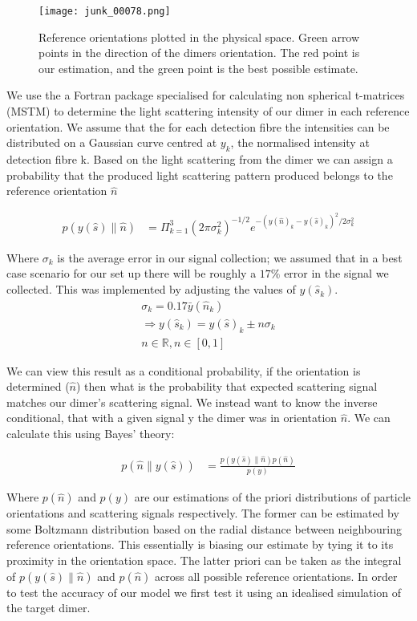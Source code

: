 \documentclass[11pt]{article}
\begin{document}
	\begin{figure}[t]
		\centering
		\texttt{[image: junk\_00078.png]}
		\caption{Reference orientations plotted in the physical space. Green arrow points in the direction of the dimers orientation. The red point is our estimation, and the green point is the best possible estimate.}
	\end{figure}
	
	We use the a Fortran package specialised for calculating non spherical t-matrices (MSTM) \cite{MSTM} to determine the light scattering intensity of our dimer in each reference orientation. We assume that the for each detection fibre the intensities can be distributed on a Gaussian curve centred at $y_k$, the normalised intensity at detection fibre k. Based on the light scattering from the dimer we can assign a probability that the produced light scattering pattern produced belongs to the reference orientation $\hat{n}$
	
	\begin{align}
		p(y(\hat{s})\parallel\hat{n})&= \Pi^3_{k=1} 
		(2\pi\sigma_k^2)^{-1/2} e^{-(y(\hat{n})_k-y(\hat{s})_k)^2/2\sigma_k^2}
	\end{align}
	
	Where $\sigma_k$ is the average error in our signal collection; we assumed that in a best case scenario for our set up there will be roughly a $17\%$ error in the signal we collected. This was implemented by adjusting the values of $y(\hat{s}_k)$. 
	\begin{eqnarray*}
		\sigma_k = 0.17\bar{y}(\hat{n}_k) \\
		\Rightarrow y(\hat{s}_k) = y(\hat{s})_k \pm n\sigma_k \\ 
		n \in \mathbb{R}, n\in[0,1]
	\end{eqnarray*}
	
	We can view this result as a conditional probability, if the orientation is determined ($\hat{n}$) then what is the probability that expected scattering signal matches our dimer's scattering signal. We instead want to know the inverse conditional, that with a given signal y the dimer was in orientation $\hat{n}$. We can calculate this using Bayes' theory:
	
	\begin{align}
		p(\hat{n}\parallel y(\hat{s}))&= \frac{p(y(\hat{s})\parallel\hat{n})p(\hat{n})}{p(y)}
	\end{align}
	
	Where $p(\hat{n})$ and $p(y)$ are our estimations of the priori distributions of particle orientations and scattering signals respectively. The former can be estimated by some Boltzmann distribution based on the radial distance between neighbouring reference orientations. This essentially is biasing our estimate by tying it to its proximity in the orientation space. The latter priori can be taken as the integral of $p(y(\hat{s})\parallel \hat{n})$ and $p(\hat{n})$ across all possible reference orientations. In order to test the accuracy of our model we first test it using an idealised simulation of the target dimer. 
	
\end{document}
